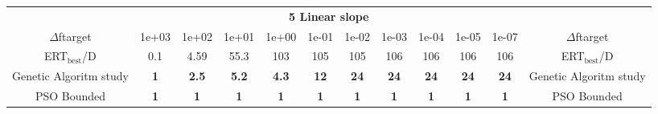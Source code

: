 \begin{tabular}{cccccccccccc}
 & \multicolumn{10}{c}{{\normalsize \textbf{5 Linear slope}}}\\
$\Delta$ftarget& 1e+03& 1e+02& 1e+01& 1e+00& 1e-01& 1e-02& 1e-03& 1e-04& 1e-05& 1e-07 & $\Delta$ftarget \\
ERT$_{\textrm{best}}$/D& 0.1& 4.59& 55.3& 103& 105& 105& 106& 106& 106& 106 & ERT$_{\textrm{best}}$/D \\
\hline
Genetic Algoritm study & \textbf{1} & \textbf{2.5} & \textbf{5.2} & \textbf{4.3} & \textbf{12} & \textbf{24} & \textbf{24} & \textbf{24} & \textbf{24} & \textbf{24} & Genetic Algoritm study \cite{add_an_entry_for_Genetic Algoritm study_in_bbob.bib}\\
PSO Bounded & \textbf{1} & \textbf{1} & \textbf{1} & \textbf{1} & \textbf{1} & \textbf{1} & \textbf{1} & \textbf{1} & \textbf{1} & \textbf{1} & PSO Bounded \cite{add_an_entry_for_PSO Bounded_in_bbob.bib}
\end{tabular}
